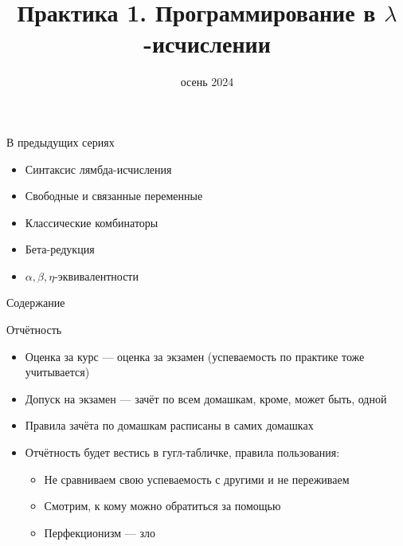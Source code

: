 
\newif\ifhandout




\title[Программирование в $\lambda$-исчислении]{Практика 1. Программирование в $\lambda$-исчислении}
\date{осень 2024}



    \setcounter{framenumber}{-1}
    \maketitle

    \begin{frame}{В предыдущих сериях}
        \begin{itemize}
            \item[\newtopic] Синтаксис лямбда-исчисления
            \item[\newtopic] Свободные и связанные переменные
            \item[\newtopic] Классические комбинаторы
            \item[\newtopic] Бета-редукция
            \item[\newtopic] $\alpha, \beta,\eta$-эквивалентности
        \end{itemize}
    \end{frame}

    \begin{frame}[noframenumbering]{Содержание}
        \tableofcontents
    \end{frame}


    \begin{frame}{Отчётность} %
        \begin{itemize}
            \item Оценка за курс --- оценка за экзамен (успеваемость по практике тоже учитывается)
            \item Допуск на экзамен --- зачёт по всем домашкам, кроме, может быть, одной
            \item Правила зачёта по домашкам расписаны в самих домашках
            \item Отчётность будет вестись в гугл-табличке, правила пользования:
            \begin{itemize}
                \item Не сравниваем свою успеваемость с другими и не переживаем
                \item Смотрим, к кому можно обратиться за помощью
                \item Перфекционизм --- зло
            \end{itemize}
        \end{itemize}
    \end{frame}

